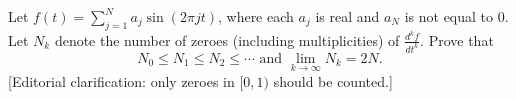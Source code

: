 Let $f(t)=\sum_{j=1}^N a_j \sin(2\pi jt)$, where each $a_j$ is real
and
$a_N$ is not equal to 0.  Let $N_k$ denote the number of zeroes (including
multiplicities) of $\frac{d^k f}{dt^k}$.
Prove that
\[N_0\leq N_1\leq N_2\leq \cdots \mbox{ and } \lim_{k\to\infty} N_k =
2N.\]
[Editorial clarification: only zeroes in $[0, 1)$ should be counted.]
